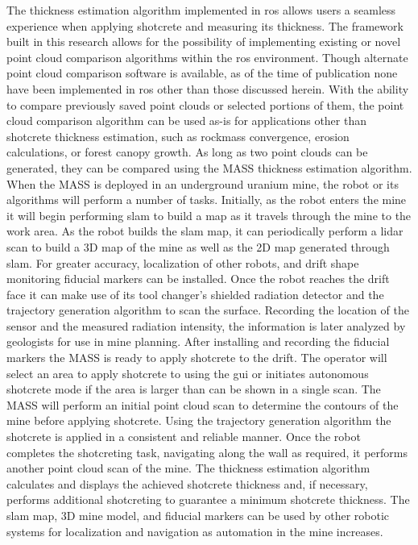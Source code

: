 The thickness estimation algorithm implemented in \acrshort{ros} allows users a seamless experience when applying shotcrete and measuring its thickness. The framework built in this research allows for the possibility of implementing existing or novel point cloud comparison algorithms within the \acrshort{ros} environment. Though alternate point cloud comparison software is available, as of the time of publication none have been implemented in \acrshort{ros} other than those discussed herein. With the ability to compare previously saved point clouds or selected portions of them, the point cloud comparison algorithm can be used as-is for applications other than shotcrete thickness estimation, such as rockmass convergence, erosion calculations, or forest canopy growth. As long as two point clouds can be generated, they can be compared using the MASS thickness estimation algorithm.\\

When the MASS is deployed in an underground uranium mine, the robot or its algorithms will perform a number of tasks. Initially, as the robot enters the mine it will begin performing \acrshort{slam} to build a map as it travels through the mine to the work area. As the robot builds the \acrshort{slam} map, it can periodically perform a \acrshort{lidar} scan to build a 3D map of the mine as well as the 2D map generated through \acrshort{slam}. For greater accuracy, localization of other robots, and drift shape monitoring fiducial markers can be installed. Once the robot reaches the drift face it can make use of its tool changer's shielded radiation detector and the trajectory generation algorithm to scan the surface. Recording the location of the sensor and the measured radiation intensity, the information is later analyzed by geologists for use in mine planning. After installing and recording the fiducial markers the MASS is ready to apply shotcrete to the drift. The operator will select an area to apply shotcrete to using the \acrshort{gui} or initiates autonomous shotcrete mode if the area is larger than can be shown in a single scan. The MASS will perform an initial point cloud scan to determine the contours of the mine before applying shotcrete. Using the trajectory generation algorithm the shotcrete is applied in a consistent and reliable manner. Once the robot completes the shotcreting task, navigating along the wall as required, it performs another point cloud scan of the mine. The thickness estimation algorithm calculates and displays the achieved shotcrete thickness and, if necessary, performs additional shotcreting to guarantee a minimum shotcrete thickness. The \acrshort{slam} map, 3D mine model, and fiducial markers can be used by other robotic systems for localization and navigation as automation in the mine increases.\\

